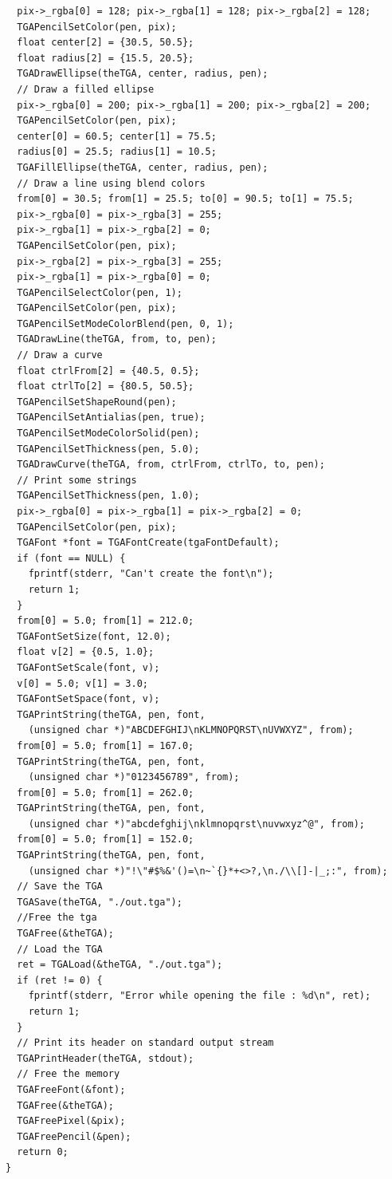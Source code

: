 \documentclass[12pt, a4paper]{article}
\begin{document}
\begin{scriptsize}
\begin{ttfamily}
\begin{lstlisting}
  pix->_rgba[0] = 128; pix->_rgba[1] = 128; pix->_rgba[2] = 128;
  TGAPencilSetColor(pen, pix);
  float center[2] = {30.5, 50.5};
  float radius[2] = {15.5, 20.5};
  TGADrawEllipse(theTGA, center, radius, pen);
  // Draw a filled ellipse
  pix->_rgba[0] = 200; pix->_rgba[1] = 200; pix->_rgba[2] = 200;
  TGAPencilSetColor(pen, pix);
  center[0] = 60.5; center[1] = 75.5;
  radius[0] = 25.5; radius[1] = 10.5;
  TGAFillEllipse(theTGA, center, radius, pen);
  // Draw a line using blend colors
  from[0] = 30.5; from[1] = 25.5; to[0] = 90.5; to[1] = 75.5;
  pix->_rgba[0] = pix->_rgba[3] = 255;
  pix->_rgba[1] = pix->_rgba[2] = 0;
  TGAPencilSetColor(pen, pix);
  pix->_rgba[2] = pix->_rgba[3] = 255;
  pix->_rgba[1] = pix->_rgba[0] = 0;
  TGAPencilSelectColor(pen, 1);
  TGAPencilSetColor(pen, pix);
  TGAPencilSetModeColorBlend(pen, 0, 1);
  TGADrawLine(theTGA, from, to, pen);
  // Draw a curve
  float ctrlFrom[2] = {40.5, 0.5};
  float ctrlTo[2] = {80.5, 50.5};
  TGAPencilSetShapeRound(pen);
  TGAPencilSetAntialias(pen, true);
  TGAPencilSetModeColorSolid(pen);
  TGAPencilSetThickness(pen, 5.0);
  TGADrawCurve(theTGA, from, ctrlFrom, ctrlTo, to, pen);
  // Print some strings
  TGAPencilSetThickness(pen, 1.0);
  pix->_rgba[0] = pix->_rgba[1] = pix->_rgba[2] = 0;
  TGAPencilSetColor(pen, pix);
  TGAFont *font = TGAFontCreate(tgaFontDefault);
  if (font == NULL) {
    fprintf(stderr, "Can't create the font\n");
    return 1;
  }
  from[0] = 5.0; from[1] = 212.0;
  TGAFontSetSize(font, 12.0);
  float v[2] = {0.5, 1.0};
  TGAFontSetScale(font, v);
  v[0] = 5.0; v[1] = 3.0;
  TGAFontSetSpace(font, v);
  TGAPrintString(theTGA, pen, font, 
    (unsigned char *)"ABCDEFGHIJ\nKLMNOPQRST\nUVWXYZ", from);
  from[0] = 5.0; from[1] = 167.0;
  TGAPrintString(theTGA, pen, font, 
    (unsigned char *)"0123456789", from);
  from[0] = 5.0; from[1] = 262.0;
  TGAPrintString(theTGA, pen, font, 
    (unsigned char *)"abcdefghij\nklmnopqrst\nuvwxyz^@", from);
  from[0] = 5.0; from[1] = 152.0;
  TGAPrintString(theTGA, pen, font, 
    (unsigned char *)"!\"#$%&'()=\n~`{}*+<>?,\n./\\[]-|_;:", from);
  // Save the TGA
  TGASave(theTGA, "./out.tga");
  //Free the tga
  TGAFree(&theTGA);
  // Load the TGA 
  ret = TGALoad(&theTGA, "./out.tga");
  if (ret != 0) {
    fprintf(stderr, "Error while opening the file : %d\n", ret);
    return 1;
  }
  // Print its header on standard output stream
  TGAPrintHeader(theTGA, stdout);
  // Free the memory
  TGAFreeFont(&font);
  TGAFree(&theTGA);
  TGAFreePixel(&pix);
  TGAFreePencil(&pen);
  return 0;
}
\end{lstlisting}
\end{ttfamily}
\end{scriptsize}
\end{document}
